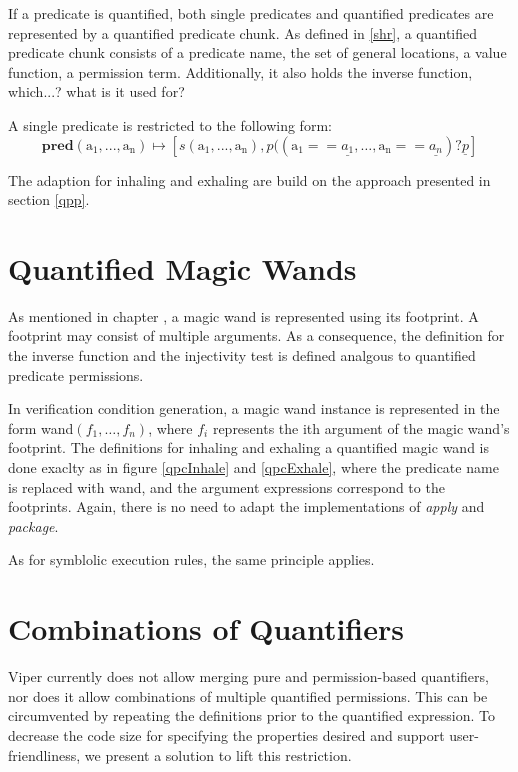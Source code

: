 \documentclass[12pt]{article}
\begin{document}
If a predicate is quantified, both single predicates and quantified predicates are represented by a quantified predicate chunk. As defined in \ref{shr}, a quantified predicate chunk consists of a predicate name, the set of general locations, a value function, a permission term. Additionally, it also holds the inverse function, which...? what is it used for?

A single predicate is restricted to the following form:\\

\begin{equation}
	\mathbf{pred}(\mathrm{a_1, ..., a_n})\mapsto [s(\mathrm{a_1, ..., a_n}), p((\mathrm{a_1} == \underline{a_1}, \dots, \mathrm{a_n} == \underline{a_n}) ? \underline{p}]
\end{equation}

The adaption for inhaling and exhaling are build on the approach presented in section \ref{qpp}.

\section{Quantified Magic Wands}
As mentioned in chapter , a magic wand is represented using its footprint. A footprint may consist of multiple arguments. As a consequence, the definition for the inverse function and the injectivity test is defined analgous to quantified predicate permissions.

In verification condition generation, a magic wand instance is represented in the form wand\( (f_1, \dots, f_n) \), where \(f_i\) represents the ith argument of the magic wand's footprint. The definitions for inhaling and exhaling a quantified magic wand is done exaclty as in figure \ref{qpcInhale} and \ref{qpcExhale}, where the predicate name is replaced with wand, and the argument expressions correspond to the footprints.
Again, there is no need to adapt the implementations of \textit{apply} and \textit{package}.

As for symblolic execution rules, the same principle applies.%

\section{Combinations of Quantifiers}
Viper currently does not allow merging pure and permission-based quantifiers, nor does it allow combinations of multiple quantified permissions. This can be circumvented by repeating the definitions prior to the quantified expression.
To decrease the code size for specifying the properties desired and support user-friendliness, we present a solution to lift this restriction.
\end{document}
